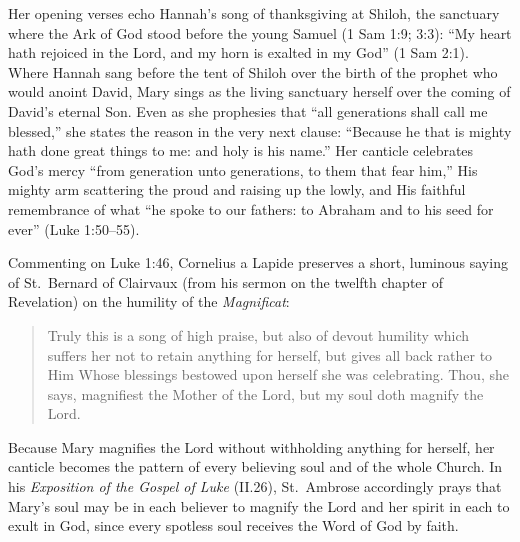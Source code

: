 Her opening verses echo Hannah's song of thanksgiving at Shiloh, the sanctuary where the Ark of God stood before the young Samuel (1 Sam 1:9; 3:3): ``My heart hath rejoiced in the Lord, and my horn is exalted in my God'' (1 Sam 2:1). Where Hannah sang before the tent of Shiloh over the birth of the prophet who would anoint David, Mary sings as the living sanctuary herself over the coming of David's eternal Son. Even as she prophesies that ``all generations shall call me blessed,'' she states the reason in the very next clause: ``Because he that is mighty hath done great things to me: and holy is his name.'' Her canticle celebrates God's mercy ``from generation unto generations, to them that fear him,'' His mighty arm scattering the proud and raising up the lowly, and His faithful remembrance of what ``he spoke to our fathers: to Abraham and to his seed for ever'' (Luke 1:50--55).

Commenting on Luke 1:46, Cornelius a Lapide preserves a short, luminous saying of St.\ Bernard of Clairvaux (from his sermon on the twelfth chapter of Revelation) on the humility of the \textit{Magnificat}:

\begin{quote}\small
Truly this is a song of high praise, but also of devout humility which suffers her not to retain anything for herself, but gives all back rather to Him Whose blessings bestowed upon herself she was celebrating. Thou, she says, magnifiest the Mother of the Lord, but my soul doth magnify the Lord.
\end{quote}

Because Mary magnifies the Lord without withholding anything for herself, her canticle becomes the pattern of every believing soul and of the whole Church. In his \textit{Exposition of the Gospel of Luke} (II.26), St.\ Ambrose accordingly prays that Mary's soul may be in each believer to magnify the Lord and her spirit in each to exult in God, since every spotless soul receives the Word of God by faith.
